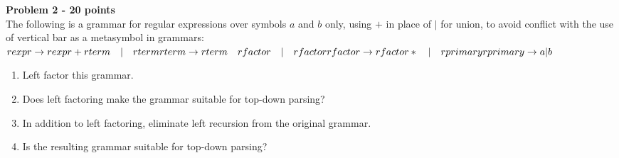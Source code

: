 \documentclass[a4paper, 11pt]{article}
\newenvironment{problem}[2][Problem]
    { \begin{mdframed}[backgroundcolor=gray!20] \textbf{#1 #2} \\}
    {  \end{mdframed}}
\begin{document}
\begin{problem}{2 - 20 points}
The following is a grammar for regular expressions over symbols $a$ and $b$ only, using $+$ in place of $|$ for union, to avoid conflict with the use  of vertical bar as a metasymbol in grammars:  \\

\noindent $rexpr \rightarrow rexpr + rterm \quad | \quad rterm  \\
rterm \rightarrow rterm  \quad rfactor \quad | \quad rfactor  \\
rfactor \rightarrow rfactor * \quad | \quad rprimary  \\
rprimary \rightarrow a | b$ \\

\begin{enumerate}[a]
    \item Left factor this grammar.
    \item Does left factoring make the grammar suitable for top-down parsing?
    \item In addition to left factoring, eliminate left recursion from the original  grammar.
    \item Is the resulting grammar suitable for top-down parsing?
\end{enumerate}

\end{problem}
\end{document}
